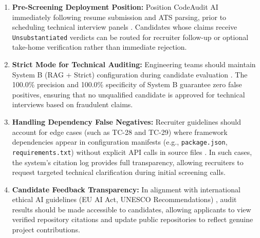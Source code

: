 \begin{enumerate}[leftmargin=*, label=\arabic*.]
    \item \textbf{Pre-Screening Deployment Position:} Position CodeAudit AI immediately following resume submission and ATS parsing, prior to scheduling technical interview panels \cite{ref7, ref8}. Candidates whose claims receive \texttt{Unsubstantiated} verdicts can be routed for recruiter follow-up or optional take-home verification rather than immediate rejection.
    \item \textbf{Strict Mode for Technical Auditing:} Engineering teams should maintain System B (RAG + Strict) configuration during candidate evaluation \cite{ref36}. The 100.0\% precision and 100.0\% specificity of System B guarantee zero false positives, ensuring that no unqualified candidate is approved for technical interviews based on fraudulent claims.
    \item \textbf{Handling Dependency False Negatives:} Recruiter guidelines should account for edge cases (such as TC-28 and TC-29) where framework dependencies appear in configuration manifests (e.g., \texttt{package.json}, \texttt{requirements.txt}) without explicit API calls in source files \cite{ref24, ref64}. In such cases, the system's citation log provides full transparency, allowing recruiters to request targeted technical clarification during initial screening calls.
    \item \textbf{Candidate Feedback Transparency:} In alignment with international ethical AI guidelines (EU AI Act, UNESCO Recommendations) \cite{ref65, ref66}, audit results should be made accessible to candidates, allowing applicants to view verified repository citations and update public repositories to reflect genuine project contributions.
\end{enumerate}
